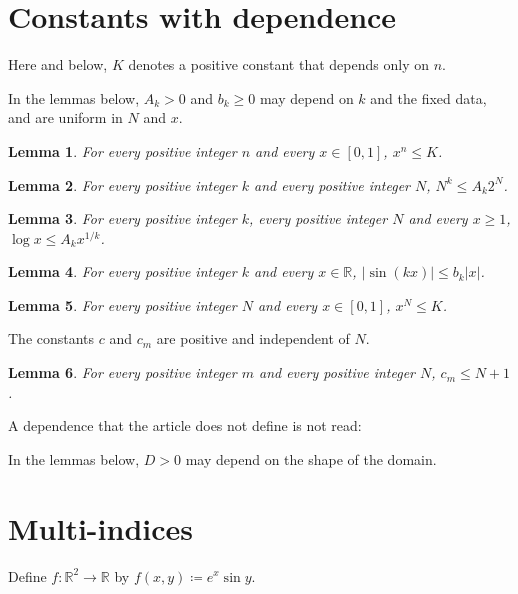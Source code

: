 \documentclass{article}
\newtheorem{lemma}{Lemma}
\begin{document}
\section{Constants with dependence}

Here and below, $K$ denotes a positive constant that depends only on $n$.

In the lemmas below, $A_k>0$ and $b_k\ge0$ may depend on $k$ and the fixed data, and are uniform in $N$ and $x$.

\begin{lemma}\label{powers}
For every positive integer $n$ and every $x\in[0,1]$, $x^n\le K$.
\end{lemma}

\begin{lemma}\label{exponential}
For every positive integer $k$ and every positive integer $N$, $N^k\le A_k2^N$.
\end{lemma}

\begin{lemma}\label{logarithm}
For every positive integer $k$, every positive integer $N$ and every $x\ge1$, $\log x\le A_kx^{1/k}$.
\end{lemma}

\begin{lemma}\label{sine}
For every positive integer $k$ and every $x\in\mathbb R$, $|\sin(kx)|\le b_k|x|$.
\end{lemma}

\begin{lemma}\label{noparameter}
For every positive integer $N$ and every $x\in[0,1]$, $x^N\le K$.
\end{lemma}

The constants $c$ and $c_m$ are positive and independent of $N$.

\begin{lemma}\label{independent}
For every positive integer $m$ and every positive integer $N$, $c_m\le N+1$.
\end{lemma}

A dependence that the article does not define is not read:

In the lemmas below, $D>0$ may depend on the shape of the domain.

\section{Multi-indices}

Define $f:\mathbb R^2\to\mathbb R$ by $f(x,y)\coloneqq e^{x}\sin y$.
\end{document}
